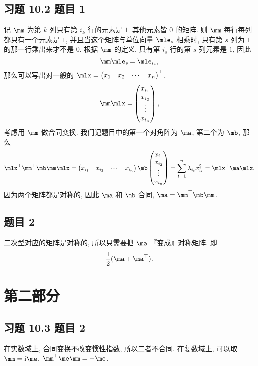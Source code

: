 \subsection*{ 习题 10.2 题目 1 }
\begin{solution}
记 $\mm$ 为第 $k$ 列只有第 $i_k$ 行的元素是 $1$, 其他元素皆 $0$ 的矩阵. 则 $\mm$ 每行每列都只有一个元素是 $1$, 并且当这个矩阵与单位向量 $\mle_s$ 相乘时, 只有第 $s$ 列为 $1$ 的那一行乘出来才不是 $0$. 根据 $\mm$ 的定义, 只有第 $i_s$ 行的第 $s$ 列元素是 $1$, 因此
\[
    \mm \mle_s = \mle_{i_s},
\]
那么可以写出对一般的 $\mlx = \begin{pmatrix} x_1 & x_2 & \cdots & x_n \end{pmatrix}^\top$,
\[
    \mm \mlx = \begin{pmatrix} x_{i_1} \\ x_{i_2} \\ \vdots \\ x_{i_n} \end{pmatrix},
\]
考虑用 $\mm$ 做合同变换. 我们记题目中的第一个对角阵为 $\ma$, 第二个为 $\mb$, 那么
\[
\mlx^\top \mm^\top \mb \mm \mlx = \begin{pmatrix} x_{i_1} & x_{i_2} & \cdots & x_{i_n} \end{pmatrix} \mb \begin{pmatrix} x_{i_1} \\ x_{i_2} \\ \vdots \\ x_{i_n} \end{pmatrix} = \sum_{t = 1}^{n} \lambda_{i_t}x_{i_t}^2 = \mlx^{\top} \ma \mlx,
\]
因为两个矩阵都是对称的, 因此 $\ma$ 和 $\mb$ 合同, $\ma = \mm^\top \mb \mm$.
\end{solution}

\subsection*{ 题目 2 }
\begin{solution}
二次型对应的矩阵是对称的, 所以只需要把 $\ma$ 『变成』对称矩阵. 即
\[
\frac{1}{2}(\ma + \ma^{\top}).
\]
\end{solution}

\newpage
\section{第二部分}
\subsection*{ 习题 10.3 题目 2 }
\begin{solution}
在实数域上, 合同变换不改变惯性指数, 所以二者不合同. 在复数域上, 可以取 $\mm = \mathrm{i}\me$, $\mm^\top \me \mm = -\me$.
\end{solution}

